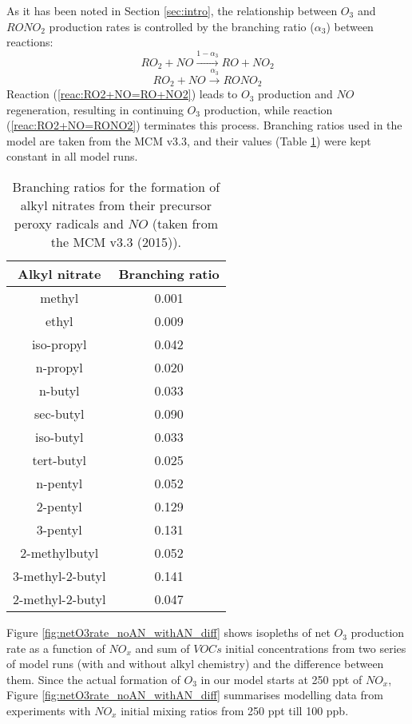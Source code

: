 \documentclass[11pt,a4paper]{article}
\begin{document}
As it has been noted in Section \ref{sec:intro}, the relationship between $O_3$ and $RONO_2$ production rates is controlled by the branching ratio ($\alpha_3$) between reactions:
\begin{equation}\label{reac:RO2+NO=RO+NO2}
RO_2 + NO \xrightarrow{1-\alpha_3} RO + NO_2
\end{equation}
\begin{equation}\label{reac:RO2+NO=RONO2}
RO_2 + NO \xrightarrow{\alpha_3} RONO_2
\end{equation}
Reaction (\ref{reac:RO2+NO=RO+NO2}) leads to $O_3$ production and $NO$ regeneration, resulting in continuing $O_3$ production, while reaction (\ref{reac:RO2+NO=RONO2}) terminates this process. Branching ratios used in the model are taken from the MCM v3.3, and their values (Table \ref{tab:ANbranching}) were kept constant in all model runs.
\begin{table} %
\caption{Branching ratios for the formation of alkyl nitrates from their precursor peroxy radicals and $NO$ (taken from the MCM v3.3 (2015)).}\label{tab:ANbranching}
\centering
\begin{tabular}{cc}
\hline
Alkyl nitrate    & Branching ratio \\
\hline
methyl           & 0.001 \\
ethyl            & 0.009 \\
iso-propyl       & 0.042 \\
n-propyl         & 0.020 \\
n-butyl          & 0.033 \\
sec-butyl        & 0.090 \\
iso-butyl        & 0.033 \\ 
tert-butyl       & 0.025 \\
n-pentyl         & 0.052 \\
2-pentyl         & 0.129 \\
3-pentyl         & 0.131 \\
2-methylbutyl    & 0.052 \\
3-methyl-2-butyl & 0.141 \\
2-methyl-2-butyl & 0.047 \\
\hline
\end{tabular}
\end{table}

Figure \ref{fig:netO3rate_noAN_withAN_diff} shows isopleths of net $O_3$ production rate as a function of $NO_x$ and sum of $VOCs$ initial concentrations from two series of model runs (with and without alkyl chemistry) and the difference between them. Since the actual formation of $O_3$ in our model starts at 250 ppt of $NO_x$, Figure \ref{fig:netO3rate_noAN_withAN_diff} summarises modelling data from experiments with $NO_x$ initial mixing ratios from 250 ppt till 100 ppb.
\end{document}
